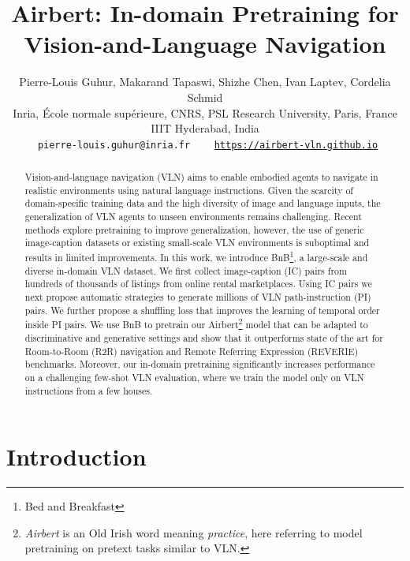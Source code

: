 \RequirePackage[dvipsnames,table]{xcolor} \documentclass[10pt,twocolumn,letterpaper]{article}
\newcommand{\airbert}{Airbert}
\newcommand{\airbnb}{BnB}
\begin{document}
\title{Airbert: In-domain Pretraining for Vision-and-Language Navigation}


\author{Pierre-Louis Guhur,
Makarand Tapaswi,
Shizhe Chen,
Ivan Laptev,
Cordelia Schmid\\
Inria, \'Ecole normale sup\'erieure, CNRS, PSL Research University, Paris, France\\
IIIT Hyderabad, India\\
{\tt\small  \email~pierre-louis.guhur@inria.fr}  ~~
{\tt\small \website~\url{https://airbert-vln.github.io}}
}


\maketitle
\ificcvfinal\thispagestyle{empty}\fi



\begin{abstract}
Vision-and-language navigation (VLN) aims to enable embodied agents to navigate in realistic environments using natural language instructions.
Given the scarcity of domain-specific training data and the high diversity of image and language inputs, the generalization of VLN agents to unseen environments remains challenging.
Recent methods explore pretraining to improve generalization, however, the use of generic image-caption datasets or existing small-scale VLN environments 
is suboptimal and results in limited improvements.
In this work, we introduce \airbnb\footnote{Bed and Breakfast}, a large-scale and diverse in-domain VLN dataset. 
We first collect image-caption (IC) pairs from hundreds of thousands of listings from online rental marketplaces.
Using IC pairs we next propose automatic strategies to generate millions of VLN path-instruction (PI) pairs.
We further propose a shuffling loss that improves the learning of temporal order inside PI pairs.
We use \airbnb{} to pretrain our \airbert\footnote{
\emph{\airbert} is an Old Irish word meaning \emph{practice}, here referring to model pretraining on pretext tasks similar to VLN.}
model that can be adapted to discriminative and generative settings and show that it outperforms state of the art for Room-to-Room (R2R) navigation and Remote Referring Expression (REVERIE) benchmarks.
Moreover, our in-domain pretraining significantly increases performance on a challenging few-shot VLN evaluation, where we train the model only on VLN instructions from a few houses.
\end{abstract}

 \section{Introduction}
\label{sec:intro}
\end{document}
